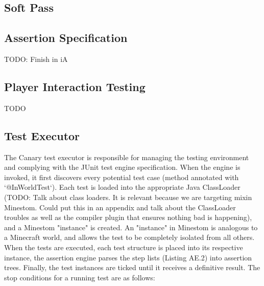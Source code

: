 \documentclass{article}
\begin{document}
\begin{doublespacing}
\subsection{Soft Pass}

\subsection{Assertion Specification}
TODO: Finish in iA

\subsection{Player Interaction Testing}
TODO

\subsection{Test Executor}
The Canary test executor is responsible for managing the testing environment and complying with the JUnit test engine specification. When the engine is invoked, it first discovers every potential test case (method annotated with `@InWorldTest`). Each test is loaded into the appropriate Java ClassLoader (TODO: Talk about class loaders. It is relevant because we are targeting mixin Minestom. Could put this in an appendix and talk about the ClassLoader troubles as well as the compiler plugin that ensures nothing bad is happening), and a Minestom "instance" is created. An "instance" in Minestom is analogous to a Minecraft world, and allows the test to be completely isolated from all others. When the tests are executed, each test structure is placed into its respective instance, the assertion engine parses the step lists (Listing AE.2) into assertion trees. Finally, the test instances are ticked until it receives a definitive result. The stop conditions for a running test are as follows:


\end{doublespacing}
\end{document}
